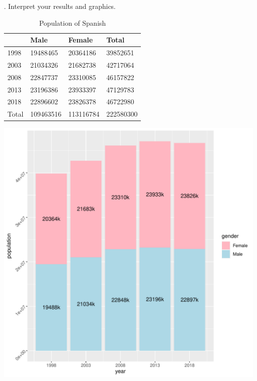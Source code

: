 \documentclass[12pt, oneside]{report}\usepackage[]{graphicx}\usepackage[]{color}
\makeatletter
\def\maxwidth{ %
  \ifdim\Gin@nat@width>\linewidth
    \linewidth
  \else
    \Gin@nat@width
  \fi
}
\makeatother
\begin{document}
. Interpret your results and graphics.
\begin{table}[ht]
\centering
\begingroup\large
\begin{tabular}{|l|l|l|l|}
  \hline
 & Male & Female & Total \\ 
  \hline
1998 & 19488465 & 20364186 & 39852651 \\ 
  2003 & 21034326 & 21682738 & 42717064 \\ 
  2008 & 22847737 & 23310085 & 46157822 \\ 
  2013 & 23196386 & 23933397 & 47129783 \\ 
  2018 & 22896602 & 23826378 & 46722980 \\ 
  Total & 109463516 & 113116784 & 222580300 \\ 
   \hline
\end{tabular}
\endgroup
\caption{Population of Spanish} 
\end{table}

\includegraphics[width=\maxwidth]{figure/unnamed-chunk-13-1} 
\end{document}
